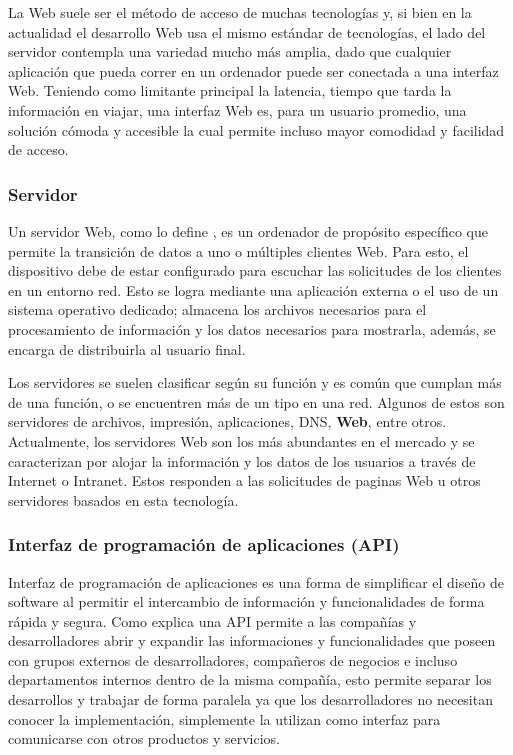 La Web suele ser el método de acceso de muchas tecnologías y, si bien en la actualidad
el desarrollo Web usa el mismo estándar de tecnologías, el lado del servidor
contempla una variedad mucho más amplia, dado que cualquier aplicación que
pueda correr en un ordenador puede ser conectada a una interfaz Web. Teniendo
como limitante principal la latencia,  tiempo que tarda la información en viajar,
una interfaz Web es, para un usuario promedio, una solución cómoda y
accesible la cual  permite incluso  mayor comodidad y facilidad de acceso.


\subsubsection*{Servidor}

Un servidor Web, como lo define \Cite{servidor},  es un ordenador de propósito
específico que permite la
transición de datos a uno o múltiples clientes Web. Para esto, el dispositivo
debe de estar configurado para escuchar las solicitudes de los clientes en un
entorno red. Esto se logra mediante una aplicación externa o el uso de un
sistema operativo dedicado; almacena los archivos
necesarios para el procesamiento de información y los datos necesarios para
mostrarla, además, se encarga de distribuirla al usuario final.

Los servidores se suelen clasificar según su función y es común que cumplan más
de una función, o se encuentren más de un tipo en una red. Algunos de estos son
servidores de archivos, impresión, aplicaciones, DNS, \textbf{Web}, entre otros.
Actualmente, los servidores Web son los más abundantes en el mercado
y se caracterizan por alojar la información y los datos de los usuarios a través
de Internet o Intranet. Estos responden a las solicitudes de paginas Web u otros
servidores basados en esta tecnología.


\subsubsection{Interfaz de programación de aplicaciones (API)}
Interfaz de programación de aplicaciones es una forma de simplificar el diseño
de software al permitir el intercambio de información y funcionalidades de forma
rápida y segura. Como explica \cite{API} una API permite a las compañías y
desarrolladores abrir y expandir las informaciones y funcionalidades que poseen
con grupos externos de desarrolladores, compañeros de negocios e incluso departamentos
internos dentro de la misma compañía, esto permite separar los desarrollos y
trabajar de forma paralela ya que los desarrolladores no necesitan conocer la
implementación, simplemente la utilizan como interfaz para comunicarse con otros
productos y servicios.

